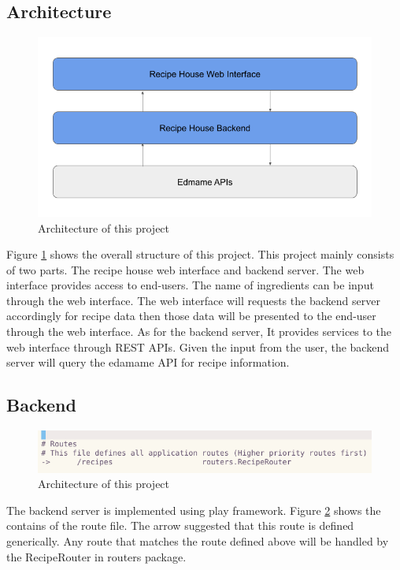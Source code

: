 \documentclass{article}
\begin{document}
\begin{normalsize}
  \subsection{Architecture}
  \begin{figure}[H]
    \centeringng
    \centerline{\includegraphics[scale=0.4]{archi}}
    \caption{Architecture of this project}
    \label{fig:architecture}
  \end{figure}

  Figure \ref{fig:architecture} shows the overall structure of this project.
  This project mainly consists of two parts. The recipe house web interface and backend server. The web interface provides access to end-users. The name of ingredients can be input through the web interface. The web interface will requests the backend server accordingly for recipe data then those data will be presented to the end-user through the web interface. As for the backend server, It provides services to the web interface through REST APIs. Given the input from the user, the backend server will query the edamame API for recipe information. 

  \subsection{Backend}
  \begin{figure}[H]
    \centeringng
    \centerline{\includegraphics[scale=0.8]{route}}
    \caption{Architecture of this project}
    \label{fig:route}
  \end{figure}
  The backend server is implemented using play framework. Figure \ref{fig:route}
  shows the contains of the route file. The arrow suggested that this route is
  defined generically. Any route that matches the route defined above will be
  handled by the RecipeRouter in routers package.


\end{normalsize}
\end{document}
